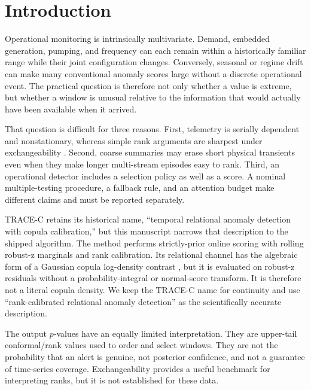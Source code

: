 \section{Introduction}

Operational monitoring is intrinsically multivariate. Demand, embedded
generation, pumping, and frequency can each remain within a historically
familiar range while their joint configuration changes. Conversely, seasonal
or regime drift can make many conventional anomaly scores large without a
discrete operational event. The practical question is therefore not only
whether a value is extreme, but whether a window is unusual relative to the
information that would actually have been available when it arrived.

That question is difficult for three reasons. First, telemetry is serially
dependent and nonstationary, whereas simple rank arguments are sharpest under
exchangeability \citep{shafer2008tutorial}. Second, coarse summaries may erase
short physical transients even when they make longer multi-stream episodes
easy to rank. Third, an operational detector includes a selection policy as
well as a score. A nominal multiple-testing procedure, a fallback rule, and an
attention budget make different claims and must be reported separately.

TRACE-C retains its historical name, ``temporal relational anomaly detection
with copula calibration,'' but this manuscript narrows that description to the
shipped algorithm. The method performs strictly-prior online scoring with
rolling robust-z marginals and rank calibration. Its relational channel has the
algebraic form of a Gaussian copula log-density contrast \citep{song2000gaussiancopula},
but it is evaluated on robust-z residuals without a probability-integral or
normal-score transform. It is therefore not a literal copula density. We keep
the TRACE-C name for continuity and use ``rank-calibrated relational anomaly
detection'' as the scientifically accurate description.

The output $p$-values have an equally limited interpretation. They are
upper-tail conformal/rank values used to order and select windows. They are not
the probability that an alert is genuine, not posterior confidence, and not a
guarantee of time-series coverage. Exchangeability provides a useful benchmark
for interpreting ranks, but it is not established for these data.

